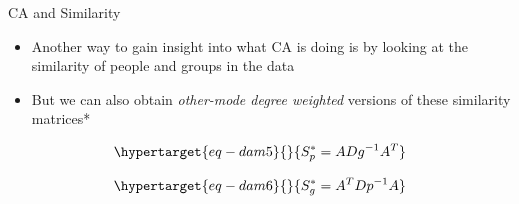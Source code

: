 \documentclass[
  ignorenonframetext,
]{beamer}
\begin{document}
\begin{frame}{CA and Similarity}
\protect\hypertarget{ca-and-similarity-1}{}
\begin{itemize}
\item
  Another way to gain insight into what CA is doing is by looking at the
  similarity of people and groups in the data
\item
  But we can also obtain \emph{other-mode degree weighted} versions of
  these similarity matrices*
\end{itemize}

\begin{equation}\protect\hypertarget{eq-dam5}{}{
S^*_p = ADg^{-1}A^T
}\label{eq-dam5}\end{equation}

\begin{equation}\protect\hypertarget{eq-dam6}{}{
S^*_g = A^TDp^{-1}A
}\label{eq-dam6}\end{equation}

\end{frame}
\end{document}
